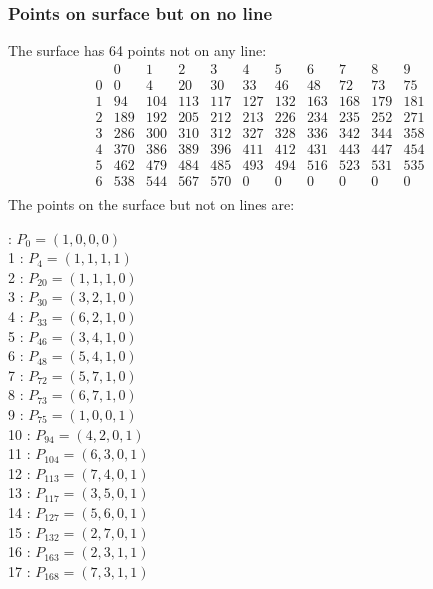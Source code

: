 \documentclass{article}
\begin{document}
{\subsubsection*{Points on surface but on no line}
The surface has 64 points not on any line:\\
$$
\begin{array}{r|*{10}{r}}
 & 0 & 1 & 2 & 3 & 4 & 5 & 6 & 7 & 8 & 9\\
\hline
0 & 0 & 4 & 20 & 30 & 33 & 46 & 48 & 72 & 73 & 75\\
1 & 94 & 104 & 113 & 117 & 127 & 132 & 163 & 168 & 179 & 181\\
2 & 189 & 192 & 205 & 212 & 213 & 226 & 234 & 235 & 252 & 271\\
3 & 286 & 300 & 310 & 312 & 327 & 328 & 336 & 342 & 344 & 358\\
4 & 370 & 386 & 389 & 396 & 411 & 412 & 431 & 443 & 447 & 454\\
5 & 462 & 479 & 484 & 485 & 493 & 494 & 516 & 523 & 531 & 535\\
6 & 538 & 544 & 567 & 570 & 0 & 0 & 0 & 0 & 0 & 0\\
\end{array}
$$
The points on the surface but not on lines are:\\
\begin{multicols}{2}
 : $P_{0}=( 1, 0, 0, 0 )$\\
1 : $P_{4}=( 1, 1, 1, 1 )$\\
2 : $P_{20}=( 1, 1, 1, 0 )$\\
3 : $P_{30}=( 3, 2, 1, 0 )$\\
4 : $P_{33}=( 6, 2, 1, 0 )$\\
5 : $P_{46}=( 3, 4, 1, 0 )$\\
6 : $P_{48}=( 5, 4, 1, 0 )$\\
7 : $P_{72}=( 5, 7, 1, 0 )$\\
8 : $P_{73}=( 6, 7, 1, 0 )$\\
9 : $P_{75}=( 1, 0, 0, 1 )$\\
10 : $P_{94}=( 4, 2, 0, 1 )$\\
11 : $P_{104}=( 6, 3, 0, 1 )$\\
12 : $P_{113}=( 7, 4, 0, 1 )$\\
13 : $P_{117}=( 3, 5, 0, 1 )$\\
14 : $P_{127}=( 5, 6, 0, 1 )$\\
15 : $P_{132}=( 2, 7, 0, 1 )$\\
16 : $P_{163}=( 2, 3, 1, 1 )$\\
17 : $P_{168}=( 7, 3, 1, 1 )$\\

\end{multicols}}
\end{document}
